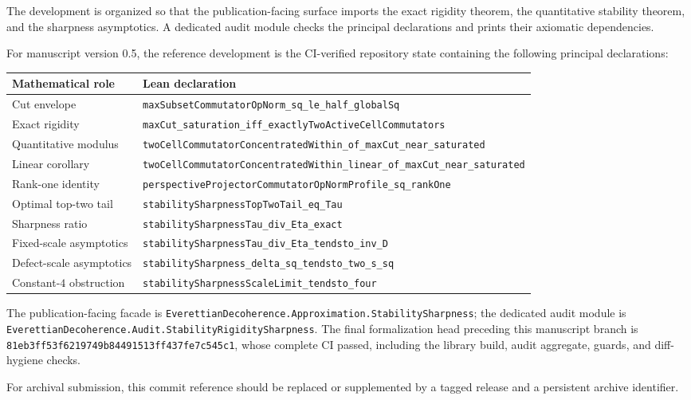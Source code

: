 \documentclass[11pt]{article}
\begin{document}
The development is organized so that the publication-facing surface imports
the exact rigidity theorem, the quantitative stability theorem, and the
sharpness asymptotics.  A dedicated audit module checks the principal
declarations and prints their axiomatic dependencies.

For manuscript version 0.5, the reference development is the CI-verified
repository state containing the following principal declarations:
\begin{center}
\begin{tabular}{p{}p{}}
\hline
Mathematical role & Lean declaration\\
\hline
Cut envelope &
\texttt{maxSubsetCommutatorOpNorm\_sq\_le\_half\_globalSq}\\
Exact rigidity &
\texttt{maxCut\_saturation\_iff\_exactlyTwoActiveCellCommutators}\\
Quantitative modulus &
\texttt{twoCellCommutatorConcentratedWithin\_of\_maxCut\_near\_saturated}\\
Linear corollary &
\texttt{twoCellCommutatorConcentratedWithin\_linear\_of\_maxCut\_near\_saturated}\\
Rank-one identity &
\texttt{perspectiveProjectorCommutatorOpNormProfile\_sq\_rankOne}\\
Optimal top-two tail &
\texttt{stabilitySharpnessTopTwoTail\_eq\_Tau}\\
Sharpness ratio &
\texttt{stabilitySharpnessTau\_div\_Eta\_exact}\\
Fixed-scale asymptotics &
\texttt{stabilitySharpnessTau\_div\_Eta\_tendsto\_inv\_D}\\
Defect-scale asymptotics &
\texttt{stabilitySharpness\_delta\_sq\_tendsto\_two\_s\_sq}\\
Constant-$4$ obstruction &
\texttt{stabilitySharpnessScaleLimit\_tendsto\_four}\\
\hline
\end{tabular}
\end{center}

The publication-facing facade is
\texttt{EverettianDecoherence.Approximation.StabilitySharpness}; the dedicated
audit module is
\texttt{EverettianDecoherence.Audit.StabilityRigiditySharpness}.
The final formalization head preceding this manuscript branch is
\texttt{81eb3ff53f6219749b84491513ff437fe7c545c1}, whose complete CI passed,
including the library build, audit aggregate, guards, and diff-hygiene checks.

For archival submission, this commit reference should be replaced or
supplemented by a tagged release and a persistent archive identifier.
\end{document}
